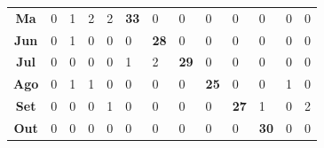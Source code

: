 \documentclass[
	12pt,				%
	openright,			%
	twoside,			%
	a4paper,			%
	english,			%
	brazil,				%
	svgnames
	]{abntex2}\usepackage[]{graphicx}\usepackage[]{color}
\begin{document}
\begin{table}[h]
\begin{tabular}{c|llllllllllll}
\textbf{Ma}  & 0                                & 1                                & 2                                & \multicolumn{1}{l|}{2}           & \multicolumn{1}{l|}{\textbf{33}} & 0                                & 0                                & 0                                & 0                                & 0                                & 0                                & 0                                \\ \cline{6-7}
\textbf{Jun} & 0                                & 1                                & 0                                & 0                                & \multicolumn{1}{l|}{0}           & \multicolumn{1}{l|}{\textbf{28}} & 0                                & 0                                & 0                                & 0                                & 0                                & 0                                \\ \cline{7-8}
\textbf{Jul} & 0                                & 0                                & 0                                & 0                                & 1                                & \multicolumn{1}{l|}{2}           & \multicolumn{1}{l|}{\textbf{29}} & 0                                & 0                                & 0                                & 0                                & 0                                \\ \cline{8-9}
\textbf{Ago} & 0                                & 1                                & 1                                & 0                                & 0                                & 0                                & \multicolumn{1}{l|}{0}           & \multicolumn{1}{l|}{\textbf{25}} & 0                                & 0                                & 1                                & 0                                \\ \cline{9-10}
\textbf{Set} & 0                                & 0                                & 0                                & 1                                & 0                                & 0                                & 0                                & \multicolumn{1}{l|}{0}           & \multicolumn{1}{l|}{\textbf{27}} & 1                                & 0                                & 2                                \\ \cline{10-11}
\textbf{Out} & 0                                & 0                                & 0                                & 0                                & 0                                & 0                                & 0                                & 0                                & \multicolumn{1}{l|}{0}           & \multicolumn{1}{l|}{\textbf{30}} & 0                                & 0                                \\ \cline{11-12}

\end{tabular}
\end{table}
\end{document}
